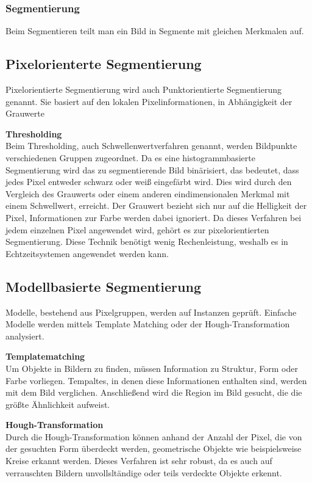     \subsubsection{Segmentierung}
    Beim Segmentieren teilt man ein Bild in Segmente mit gleichen Merkmalen auf.

    \subsection*{Pixelorienterte Segmentierung}
    Pixelorientierte Segmentierung wird auch Punktorientierte Segmentierung genannt. Sie basiert auf den lokalen Pixelinformationen, in Abhängigkeit der Grauwerte \cite{Seg_punkt}

    \textbf{Thresholding}\\
    Beim Thresholding, auch Schwellenwertverfahren genannt, werden Bildpunkte verschiedenen Gruppen zugeordnet. Da es eine histogrammbasierte Segmentierung wird das zu segmentierende Bild binärisiert, das bedeutet, dass jedes Pixel entweder schwarz oder weiß eingefärbt wird. Dies wird durch den Vergleich des Grauwerts oder einem anderen eindimensionalen Merkmal mit einem Schwellwert, erreicht. Der Grauwert bezieht sich nur auf die Helligkeit der Pixel, Informationen zur Farbe werden dabei ignoriert. Da dieses Verfahren bei jedem einzelnen Pixel angewendet wird, gehört es zur pixelorientierten Segmentierung. Diese Technik benötigt wenig Rechenleistung, weshalb es in Echtzeitsystemen angewendet werden kann.

    \subsection*{Modellbasierte Segmentierung}
    Modelle, bestehend aus Pixelgruppen, werden auf Instanzen geprüft. Einfache Modelle werden mittels Template Matching oder der Hough-Transformation analysiert. \cite{Seg_modell}

    \textbf{Templatematching}\\
    Um Objekte in Bildern zu finden, müssen Information zu Struktur, Form oder Farbe vorliegen. Tempaltes, in denen diese Informationen enthalten sind, werden mit dem Bild verglichen. Anschließend wird die Region im Bild gesucht, die die größte Ähnlichkeit aufweist.

    \textbf{Hough-Transformation}\\
    Durch die Hough-Transformation können anhand der Anzahl der Pixel, die von der gesuchten Form überdeckt werden, geometrische Objekte wie beispielsweise Kreise erkannt werden. Dieses Verfahren ist sehr robust, da es auch auf verrauschten Bildern unvollsltändige oder teils verdeckte Objekte erkennt.

